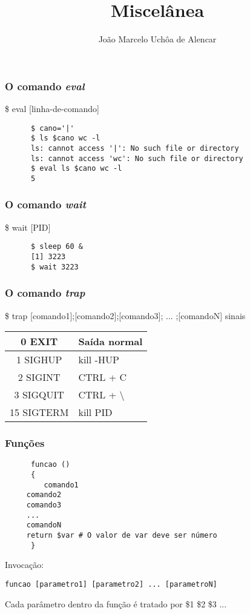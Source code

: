 \documentclass{beamer}
\title{Miscelânea}
\author[João Marcelo Uchôa de Alencar]{João Marcelo Uchôa de Alencar}
\institute{Universidade Federal do Ceará - Quixadá}
\begin{document}
   \begin{frame}
      \titlepage
   \end{frame}

   \begin{frame}[fragile]
      \frametitle{O comando \textit{eval}}
      \$ eval [linha-de-comando] \\
      \begin{verbatim}
      $ cano='|'
      $ ls $cano wc -l
      ls: cannot access '|': No such file or directory
      ls: cannot access 'wc': No such file or directory
      $ eval ls $cano wc -l
      5
      \end{verbatim}
\end{frame}

   \begin{frame}[fragile]
      \frametitle{O comando \textit{wait}}
      \$ wait [PID] \\
      \begin{verbatim}
      $ sleep 60 &
      [1] 3223
      $ wait 3223
      \end{verbatim}
\end{frame}

   \begin{frame}
      \frametitle{O comando \textit{trap}}
      \$ trap [comando1];[comando2];[comando3]; ... ;[comandoN] sinais \\
      \begin{table}
         \begin{tabular}{c|l}
         0 EXIT     & Saída normal \\
         \hline 
         1 SIGHUP   & kill -HUP \\
         \hline 
         2 SIGINT   & CTRL + C \\
         \hline 
         3 SIGQUIT  & CTRL + \textbackslash \\
         \hline 
         15 SIGTERM & kill PID \\
         \hline 
         \end{tabular}
      \end{table}
   \end{frame}

   \begin{frame}[fragile]
      \frametitle{Funções}
      \begin{verbatim}
      funcao ()
      {
         comando1
	 comando2
	 comando3
	 ...
	 comandoN
	 return $var # O valor de var deve ser número
      }
   \end{verbatim}
      Invocação:
      \begin{verbatim}
funcao [parametro1] [parametro2] ... [parametroN] 
      \end{verbatim}
      Cada parâmetro dentro da função é tratado por \$1 \$2 \$3 ...
\end{frame}
\end{document}
